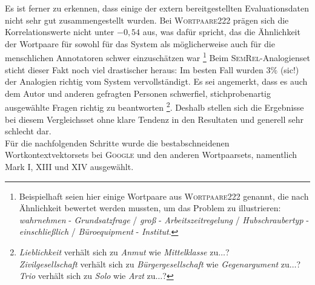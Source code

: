   Es ist ferner zu erkennen, dass einige der extern bereitgestellten Evaluationsdaten nicht sehr gut zusammengestellt wurden.
  Bei \textsc{Wortpaare222} prägen sich die Korrelationswerte nicht unter $-0,54$ aus, was dafür spricht, das die Ähnlichkeit
  der Wortpaare für sowohl für das System als möglicherweise auch für die menschlichen Annotatoren schwer einzuschätzen war
  \footnote{Beispielhaft seien hier einige Wortpaare aus \textsc{Wortpaare222} genannt, die nach Ähnlichkeit bewertet werden
  mussten, um das Problem zu illustrieren:\\
  \emph{wahrnehmen} - \emph{Grundsatzfrage} / \emph{groß} - \emph{Arbeitszeitregelung} /
  \emph{Hubschraubertyp} - \emph{einschließlich} / \emph{Büroequipment} - \emph{Institut}.}
  Beim \textsc{SemRel}-Analogienset sticht dieser Fakt noch viel drastischer heraus: Im besten Fall wurden $3\%$ (sic!)
  der Analogien richtig vom System vervollständigt. Es sei angemerkt, dass es auch dem Autor und anderen gefragten Personen
  schwerfiel, stichprobenartig ausgewählte Fragen richtig zu beantworten
  \footnote{\emph{Lieblichkeit} verhält sich zu \emph{Anmut} wie \emph{Mittelklasse} zu$\ldots$? \\
  \emph{Zivilgesellschaft} verhält sich zu \emph{Bürgergesellschaft} wie \emph{Gegenargument} zu$\ldots$? \\
  \emph{Trio} verhält sich zu \emph{Solo}  wie \emph{Arzt} zu$\ldots$? }.
  Deshalb stellen sich die Ergebnisse bei diesem Vergleichsset ohne klare Tendenz in den Resultaten und generell sehr schlecht dar.\\

  Für die nachfolgenden Schritte wurde die bestabschneidenen Wortkontextvektorsets bei \textsc{Google} und den anderen
  Wortpaarsets, namentlich Mark I, XIII und XIV ausgewählt.
